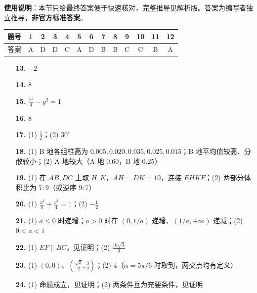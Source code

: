
\begin{gknotice}
\textbf{使用说明}：本节只给最终答案便于快速核对，完整推导见解析版。答案为编写者独立推导，\textbf{非官方标准答案}。
\end{gknotice}

\begin{center}\begin{tabular}{ccccccccccccc}
\toprule
题号 & 1 & 2 & 3 & 4 & 5 & 6 & 7 & 8 & 9 & 10 & 11 & 12 \\
\midrule
答案 & A & D & D & C & A & D & B & B & C & C & B & A \\
\bottomrule
\end{tabular}\end{center}

\begin{itemize}[leftmargin=2.6em]
  \item[\textbf{13.}] $-2$
  \item[\textbf{14.}] $8$
  \item[\textbf{15.}] $\frac{x^2}{4}-y^2=1$
  \item[\textbf{16.}] $8$
\end{itemize}

\begin{itemize}[leftmargin=2.6em]
  \item[\textbf{17.}] (1) $\frac12$；(2) $30^\circ$
  \item[\textbf{18.}] (1) B 地各组柱高为 $0.005,0.020,0.035,0.025,0.015$；B 地平均值较高、分散较小；(2) A 地较大（A 地 $0.60$，B 地 $0.25$）
  \item[\textbf{19.}] (1) 在 $AB,DC$ 上取 $H,K$，$AH=DK=10$，连接 $EHKF$；(2) 两部分体积比为 $7:9$（或逆序 $9:7$）
  \item[\textbf{20.}] (1) $\frac{x^2}{8}+\frac{y^2}{4}=1$；(2) $-\frac12$
  \item[\textbf{21.}] (1) $a\le0$ 时递增；$a>0$ 时在 $(0,1/a)$ 递增、$(1/a,+\infty)$ 递减；(2) $0<a<1$
  \item[\textbf{22.}] (1) $EF\parallel BC$，见证明；(2) $\frac{16\sqrt3}{3}$
  \item[\textbf{23.}] (1) $(0,0)$、$(\frac{\sqrt3}{2},\frac32)$；(2) $4$（$\alpha=5\pi/6$ 时取到，两交点均有定义）
  \item[\textbf{24.}] (1) 命题成立，见证明；(2) 两条件互为充要条件，见证明
\end{itemize}
